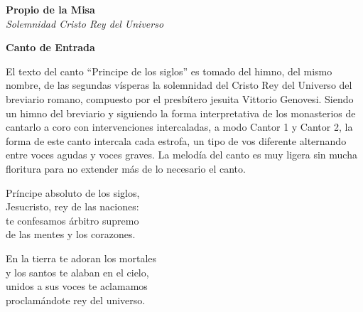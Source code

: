 \documentclass[12pt, letterpaper]{report}
\begin{document}
    {%
\parindent 0pt
\noindent
\ifx\preLilyPondExample \undefined
\else
  \expandafter\preLilyPondExample
\fi
\def\lilypondbook{}%
%
\ifx\postLilyPondExample \undefined
\else
  \expandafter\postLilyPondExample
\fi
}
    \clearpage

    {%
\parindent 0pt
\noindent
\ifx\preLilyPondExample \undefined
\else
  \expandafter\preLilyPondExample
\fi
\def\lilypondbook{}%
%
\ifx\postLilyPondExample \undefined
\else
  \expandafter\postLilyPondExample
\fi
}
    \clearpage

    {%
\parindent 0pt
\noindent
\ifx\preLilyPondExample \undefined
\else
  \expandafter\preLilyPondExample
\fi
\def\lilypondbook{}%
%
\ifx\postLilyPondExample \undefined
\else
  \expandafter\postLilyPondExample
\fi
}
    \clearpage

    \begin{center}
      \vspace*{8cm}
      \textbf{\Huge Propio de la Misa}\\
      \textit{ \Large Solemnidad Cristo Rey del Universo}
    \end{center}
    \clearpage

    \begin{center}
      \LARGE \textbf{Canto de Entrada}
    \end{center}

    \Large El texto del canto ``Principe de los siglos'' es tomado del himno, del mismo nombre, de las segundas v\'isperas la solemnidad del Cristo Rey del Universo del breviario romano, compuesto por el presb\'itero jesuita Vittorio Genovesi. Siendo un himno del breviario y siguiendo la forma interpretativa de los monasterios de cantarlo a coro con intervenciones intercaladas, a modo Cantor 1 y Cantor 2, la forma de este canto intercala cada estrofa, un tipo de vos diferente alternando entre voces agudas y voces graves. La melod\'ia del canto es muy ligera sin mucha floritura para no extender m\'as de lo necesario el canto.

    \noindent
    \LARGE Pr\'incipe absoluto de los siglos,\\
    Jesucristo, rey de las naciones:\\
    te confesamos \'arbitro supremo\\
    de las mentes y los corazones.

    \noindent
    En la tierra te adoran los mortales\\
    y los santos te alaban en el cielo,\\
    unidos a sus voces te aclamamos\\
    proclam\'andote rey del universo.
\end{document}

